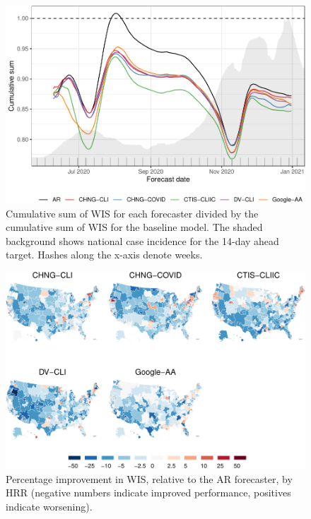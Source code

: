 \documentclass[9pt,twoside,lineno]{pnas-new}
\begin{document}
\clearpage

\clearpage

\begin{figure}

{\centering \includegraphics[width=\textwidth]{fig/cumulative-mean-1} 

}

\caption{Cumulative sum of WIS for each forecaster divided by the cumulative sum of WIS for the baseline model. The shaded background shows national case incidence for the 14-day ahead target. Hashes along the x-axis denote weeks.}\label{fig:cumulative-mean}
\end{figure}

\clearpage

\clearpage

\begin{figure}

{\centering \includegraphics[width=\textwidth]{fig/errs-in-space-1} 

}

\caption{Percentage improvement in WIS, relative to the AR forecaster, by HRR (negative numbers indicate improved performance, positives indicate worsening).}\label{fig:errs-in-space}
\end{figure}
\end{document}
